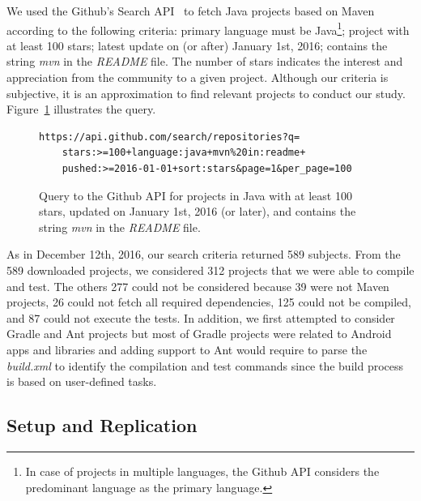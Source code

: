 We used the Github's Search API~\cite{githubsearch} to fetch Java
projects based on Maven according to the following criteria: primary
language must be Java\footnote{In case of projects in multiple
languages, the Github API considers the predominant language as the
primary language.}; project with at least 100 stars; latest update on
(or after) January 1st, 2016; contains the string \emph{mvn} in the
\emph{README} file.  The number of stars indicates the interest and
appreciation from the community to a given project.
 Although our
criteria is subjective, it is an approximation to find relevant
projects to conduct our study.  Figure~\ref{fig:subject-query}
illustrates the query.

\begin{figure}[h!]
\centering
\scriptsize
{}
\begin{lstlisting}
https://api.github.com/search/repositories?q=
    stars:>=100+language:java+mvn%20in:readme+
    pushed:>=2016-01-01+sort:stars&page=1&per_page=100

\end{lstlisting}
\caption{\label{fig:subject-query} Query to the Github API for
    projects in Java with at least 100 stars, updated on January 1st,
    2016 (or later), and contains the string \emph{mvn} in the
    \emph{README} file.}
\end{figure}

As in December 12th, 2016, our search criteria returned 589 subjects.
From the 589 downloaded projects, we considered 312 projects that we
were able to compile and test. The others 277 could not be considered
because 39 were not Maven projects, 26 could not fetch all required
dependencies, 125 could not be compiled, and 87 could not execute the
tests. In addition, we first attempted to consider Gradle and Ant
projects but most of Gradle projects were related to Android apps and
libraries and adding support to Ant would require to parse the
\emph{build.xml} to identify the compilation and test commands since
the build process is based on user-defined tasks.

\subsection{Setup and Replication}
\label{sec:setup}

